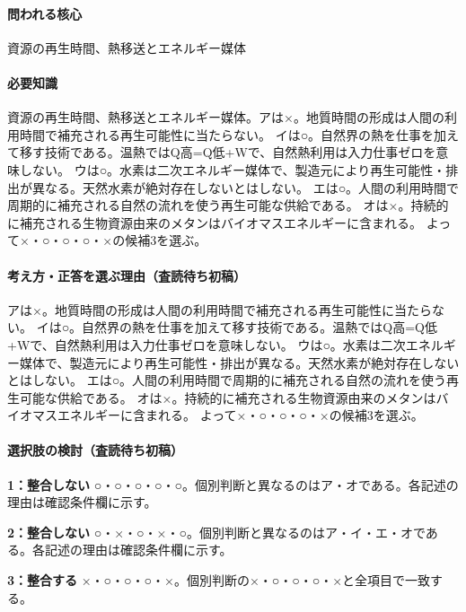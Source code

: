 \paragraph{問われる核心} 資源の再生時間、熱移送とエネルギー媒体

\paragraph{必要知識} 資源の再生時間、熱移送とエネルギー媒体。アは×。地質時間の形成は人間の利用時間で補充される再生可能性に当たらない。 イは○。自然界の熱を仕事を加えて移す技術である。温熱ではQ高=Q低+Wで、自然熱利用は入力仕事ゼロを意味しない。 ウは○。水素は二次エネルギー媒体で、製造元により再生可能性・排出が異なる。天然水素が絶対存在しないとはしない。 エは○。人間の利用時間で周期的に補充される自然の流れを使う再生可能な供給である。 オは×。持続的に補充される生物資源由来のメタンはバイオマスエネルギーに含まれる。 よって×・○・○・○・×の候補3を選ぶ。

\paragraph{考え方・正答を選ぶ理由（査読待ち初稿）} アは×。地質時間の形成は人間の利用時間で補充される再生可能性に当たらない。 イは○。自然界の熱を仕事を加えて移す技術である。温熱ではQ高=Q低+Wで、自然熱利用は入力仕事ゼロを意味しない。 ウは○。水素は二次エネルギー媒体で、製造元により再生可能性・排出が異なる。天然水素が絶対存在しないとはしない。 エは○。人間の利用時間で周期的に補充される自然の流れを使う再生可能な供給である。 オは×。持続的に補充される生物資源由来のメタンはバイオマスエネルギーに含まれる。 よって×・○・○・○・×の候補3を選ぶ。

\paragraph{選択肢の検討（査読待ち初稿）}\mbox{}\par

\noindent\textbf{1：整合しない} ○・○・○・○・○。個別判断と異なるのはア・オである。各記述の理由は確認条件欄に示す。\par

\noindent\textbf{2：整合しない} ○・×・○・×・○。個別判断と異なるのはア・イ・エ・オである。各記述の理由は確認条件欄に示す。\par

\noindent\textbf{3：整合する} ×・○・○・○・×。個別判断の×・○・○・○・×と全項目で一致する。\par

